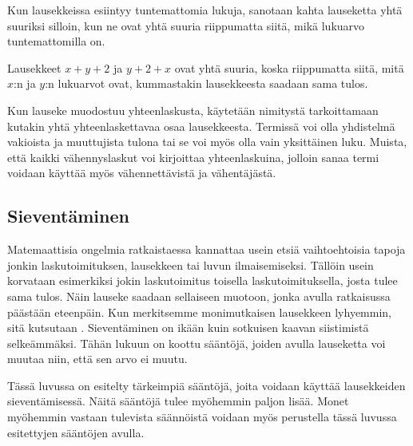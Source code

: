 Kun lausekkeissa esiintyy tuntemattomia lukuja, sanotaan kahta lauseketta yhtä suuriksi silloin, kun ne ovat yhtä suuria riippumatta siitä, mikä lukuarvo tuntemattomilla on.

\begin{esimerkki}
Lausekkeet $x+y+2$ ja $y+2+x$ ovat yhtä suuria, koska riippumatta siitä, mitä $x$:n ja $y$:n lukuarvot ovat, kummastakin lausekkeesta saadaan sama tulos.
\end{esimerkki}

Kun lauseke muodostuu yhteenlaskusta, käytetään nimitystä  tarkoittamaan kutakin yhtä yhteenlaskettavaa osaa lausekkeesta. Termissä voi olla yhdistelmä vakioista ja muuttujista tulona tai se voi myös olla vain yksittäinen luku. Muista, että kaikki vähennyslaskut voi kirjoittaa yhteenlaskuina, jolloin sanaa termi voidaan käyttää myös vähennettävistä ja vähentäjästä.

\begin{esimerkki}
\end{esimerkki}


\subsection{Sieventäminen}

Matemaattisia ongelmia ratkaistaessa kannattaa usein etsiä vaihtoehtoisia tapoja jonkin laskutoimituksen, lausekkeen tai luvun ilmaisemiseksi. Tällöin usein korvataan esimerkiksi jokin laskutoimitus toisella laskutoimituksella, josta tulee sama tulos. Näin lauseke saadaan sellaiseen muotoon, jonka avulla ratkaisussa päästään eteenpäin. Kun merkitsemme monimutkaisen lausekkeen lyhyemmin, sitä kutsutaan . Sieventäminen on ikään kuin sotkuisen kaavan siistimistä selkeämmäksi. Tähän lukuun on koottu sääntöjä, joiden avulla lauseketta voi muutaa niin, että sen arvo ei muutu. %

Tässä luvussa on esitelty tärkeimpiä sääntöjä, joita voidaan käyttää lausekkeiden sieventämisessä. Näitä sääntöjä tulee myöhemmin paljon lisää. Monet myöhemmin vastaan tulevista säännöistä voidaan myös perustella tässä luvussa esitettyjen sääntöjen avulla.

